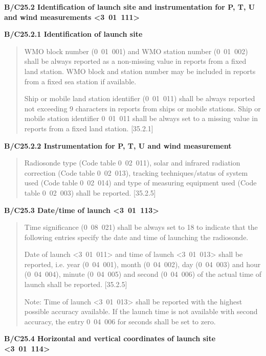 \textbf{B/C25.2 Identification of launch site and instrumentation for P, T, U and wind measurements \textless3~01~111\textgreater{}}

\textbf{B/C25.2.1 Identification of launch site}

\begin{quote}
WMO block number (0~01~001) and WMO station number (0~01~002) shall be always reported as a non-missing value in reports from a fixed land station. WMO block and station number may be included in reports from a fixed sea station if available.

Ship or mobile land station identifier (0~01~011) shall be always reported not exceeding 9 characters in reports from ships or mobile stations. Ship or mobile station identifier 0~01~011 shall be always set to a missing value in reports from a fixed land station. {[}35.2.1{]}
\end{quote}

\textbf{B/C25.2.2 Instrumentation for P, T, U and wind measurement}

\begin{quote}
Radiosonde type (Code table 0~02~011), solar and infrared radiation correction (Code table 0~02~013), tracking techniques/status of system used (Code table 0~02~014) and type of measuring equipment used (Code table 0~02~003) shall be reported. {[}35.2.5{]}
\end{quote}

\textbf{B/C25.3 Date/time of launch \textless3~01~113\textgreater{}}

\begin{quote}
Time significance (0~08~021) shall be always set to 18 to indicate that the following entries specify the date and time of launching the radiosonde.

Date of launch \textless3~01~011\textgreater{} and time of launch \textless3~01~013\textgreater{} shall be reported, i.e. year (0~04~001), month (0~04~002), day (0~04~003) and hour (0~04~004), minute (0~04~005) and second (0~04~006) of the actual time of launch shall be reported. {[}35.2.5{]}

Note: Time of launch \textless3~01~013\textgreater{} shall be reported with the highest possible accuracy available. If the launch time is not available with second accuracy, the entry 0~04~006 for seconds shall be set to zero.
\end{quote}

\textbf{B/C25.4 Horizontal and vertical coordinates of launch site \textless3~01~114\textgreater{}}

